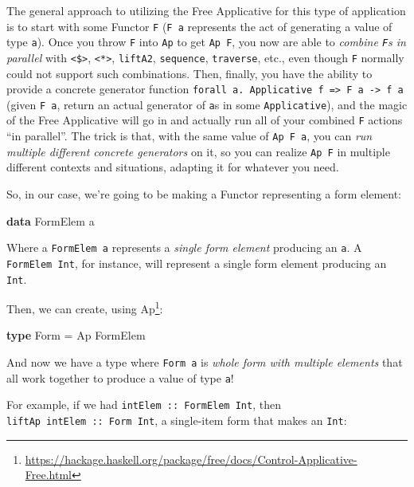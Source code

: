 \documentclass[]{article}
\newenvironment{Shaded}{}{}
\newcommand{\DataTypeTok}[1]{\textcolor[rgb]{0.56,0.13,0.00}{#1}}
\newcommand{\FunctionTok}[1]{\textcolor[rgb]{0.02,0.16,0.49}{#1}}
\newcommand{\KeywordTok}[1]{\textcolor[rgb]{0.00,0.44,0.13}{\textbf{#1}}}
\newcommand{\NormalTok}[1]{#1}
\renewcommand{\href}[2]{#2\footnote{\url{#1}}}
\begin{document}
The general approach to utilizing the Free Applicative for this type of
application is to start with some Functor \texttt{F} (\texttt{F\ a} represents
the act of generating a value of type \texttt{a}). Once you throw \texttt{F}
into \texttt{Ap} to get \texttt{Ap\ F}, you now are able to \emph{combine
\texttt{F}s in parallel} with \texttt{\textless{}\$\textgreater{}},
\texttt{\textless{}*\textgreater{}}, \texttt{liftA2}, \texttt{sequence},
\texttt{traverse}, etc., even though \texttt{F} normally could not support such
combinations. Then, finally, you have the ability to provide a concrete
generator function
\texttt{forall\ a.\ Applicative\ f\ =\textgreater{}\ F\ a\ -\textgreater{}\ f\ a}
(given \texttt{F\ a}, return an actual generator of \texttt{a}s in some
\texttt{Applicative}), and the magic of the Free Applicative will go in and
actually run all of your combined \texttt{F} actions ``in parallel''. The trick
is that, with the same value of \texttt{Ap\ F\ a}, you can \emph{run multiple
different concrete generators} on it, so you can realize \texttt{Ap\ F} in
multiple different contexts and situations, adapting it for whatever you need.

So, in our case, we're going to be making a Functor representing a form element:

\begin{Shaded}
\begin{Highlighting}[]
\KeywordTok{data} \DataTypeTok{FormElem}\NormalTok{ a}
\end{Highlighting}
\end{Shaded}

Where a \texttt{FormElem\ a} represents a \emph{single form element} producing
an \texttt{a}. A \texttt{FormElem\ Int}, for instance, will represent a single
form element producing an \texttt{Int}.

Then, we can create, using
\href{https://hackage.haskell.org/package/free/docs/Control-Applicative-Free.html}{Ap}:

\begin{Shaded}
\begin{Highlighting}[]
\KeywordTok{type} \DataTypeTok{Form} \FunctionTok{=} \DataTypeTok{Ap} \DataTypeTok{FormElem}
\end{Highlighting}
\end{Shaded}

And now we have a type where \texttt{Form\ a} is \emph{whole form with multiple
elements} that all work together to produce a value of type \texttt{a}!

For example, if we had \texttt{intElem\ ::\ FormElem\ Int}, then
\texttt{liftAp\ intElem\ ::\ Form\ Int}, a single-item form that makes an
\texttt{Int}:
\end{document}
